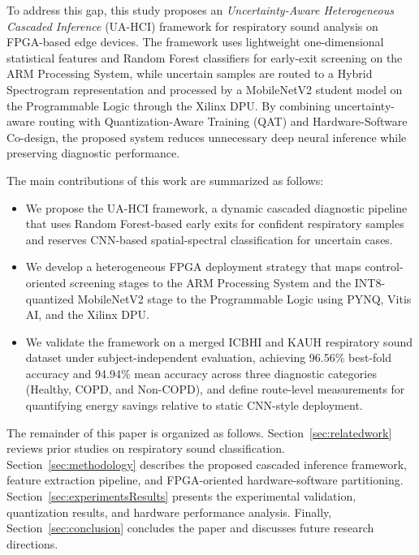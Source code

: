 

To address this gap, this study proposes an \textit{Uncertainty-Aware Heterogeneous Cascaded Inference} (UA-HCI) framework for respiratory sound analysis on FPGA-based edge devices. The framework uses lightweight one-dimensional statistical features and Random Forest classifiers for early-exit screening on the ARM Processing System, while uncertain samples are routed to a Hybrid Spectrogram representation and processed by a MobileNetV2 student model on the Programmable Logic through the Xilinx DPU. By combining uncertainty-aware routing with Quantization-Aware Training (QAT) and Hardware-Software Co-design, the proposed system reduces unnecessary deep neural inference while preserving diagnostic performance.

The main contributions of this work are summarized as follows:
\begin{itemize}
    \item We propose the UA-HCI framework, a dynamic cascaded diagnostic pipeline that uses Random Forest-based early exits for confident respiratory samples and reserves CNN-based spatial-spectral classification for uncertain cases.
    \item We develop a heterogeneous FPGA deployment strategy that maps control-oriented screening stages to the ARM Processing System and the INT8-quantized MobileNetV2 stage to the Programmable Logic using PYNQ, Vitis AI, and the Xilinx DPU.
    \item We validate the framework on a merged ICBHI and KAUH respiratory sound dataset under subject-independent evaluation, achieving 96.56\% best-fold accuracy and 94.94\% mean accuracy across three diagnostic categories (Healthy, COPD, and Non-COPD), and define route-level measurements for quantifying energy savings relative to static CNN-style deployment.
\end{itemize}

The remainder of this paper is organized as follows. Section~\ref{sec:relatedwork} reviews prior studies on respiratory sound classification. Section~\ref{sec:methodology} describes the proposed cascaded inference framework, feature extraction pipeline, and FPGA-oriented hardware-software partitioning. Section~\ref{sec:experimentsResults} presents the experimental validation, quantization results, and hardware performance analysis. Finally, Section~\ref{sec:conclusion} concludes the paper and discusses future research directions.
